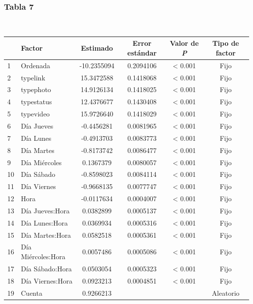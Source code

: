 \documentclass[a4paper,10pt]{article}
\begin{document}
\subsubsection{Tabla 7}
\begin{center}
  \\[0.3cm]
  \begin{tabular}{l|l|c|c|c|c}
    \hline
    & Factor & Estimado & Error estándar & Valor de \textit{P} & Tipo de factor\\
    \hline
    1 & Ordenada & -10.2355094 & 0.2094106 & < 0.001 & Fijo \\
    2 & typelink & 15.3472588 & 0.1418068 & < 0.001 & Fijo \\
    3 & typephoto & 14.9126134 & 0.1418025 & < 0.001 & Fijo \\
    4 & typestatus & 12.4376677 & 0.1430408 & < 0.001 & Fijo \\
    5 & typevideo & 15.9726640 & 0.1418029 & < 0.001 & Fijo \\
    6 & Día Jueves & -0.4456281 & 0.0081965 & < 0.001 & Fijo \\
    7 & Día Lunes & -0.4913703 & 0.0083773 & < 0.001 & Fijo \\
    8 & Día Martes & -0.8173742 & 0.0086477 & < 0.001 & Fijo \\
    9 & Día Miércoles & 0.1367379 & 0.0080057 & < 0.001 & Fijo \\
    10 & Día Sábado & -0.8598023 & 0.0084114 & < 0.001 & Fijo \\
    11 & Día Viernes & -0.9668135 & 0.0077747 & < 0.001 & Fijo \\
    12 & Hora & -0.0117634 & 0.0004007 & < 0.001 & Fijo \\
    13 & Día Jueves:Hora & 0.0382899 & 0.0005137 & < 0.001 & Fijo \\
    14 & Día Lunes:Hora & 0.0369934 & 0.0005316 & < 0.001 & Fijo \\
    15 & Día Martes:Hora & 0.0582518 & 0.0005361 & < 0.001 & Fijo \\
    16 & Día Miércoles:Hora & 0.0057486 & 0.0005086 & < 0.001 & Fijo \\
    17 & Día Sábado:Hora & 0.0503054 & 0.0005323 & < 0.001 & Fijo \\
    18 & Día Viernes:Hora & 0.0923213 & 0.0004851 & < 0.001 & Fijo \\
    19 & Cuenta & 0.9266213 &  &  & Aleatorio \\
    \hline
  \end{tabular}
\end{center}
\end{document}
